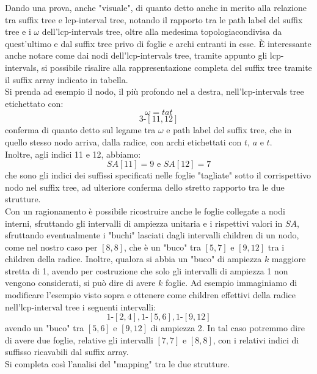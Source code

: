 \documentclass[a4paper,12pt, oneside]{book}
\begin{document}
\begin{esempio}
\begin{figure}[H]
  \end{figure}
  Dando una prova, anche "visuale", di quanto detto anche in merito alla
  relazione tra suffix tree e lcp-interval tree, notando il rapporto tra le path
  label del suffix tree e i $\omega$ dell'lcp-intervals tree, oltre alla
  medesima topologiacondivisa da quest'ultimo e dal suffix tree privo di foglie
  e archi entranti in esse. È interessante anche notare come dai nodi
  dell'lcp-intervals tree, tramite appunto gli lcp-intervals, si possibile
  risalire alla rappresentazione completa del suffix tree tramite il suffix
  array indicato in tabella.\\
  Si prenda ad esempio il nodo, il più profondo nel
  a destra, nell'lcp-intervals tree etichettato con:
  \[\omega =tat\]
  \[3\mbox{-}[11,12]\]
  conferma di quanto detto sul legame tra $\omega$ e path label
  del suffix tree, che in quello stesso nodo arriva, dalla radice, con archi
  etichettati con $t$, $a$ e $t$. \\
  Inoltre, agli indici 11 e 12, abbiamo:
  \[SA[11]=9\mbox{ e }SA[12]=7\]
  che sono gli indici dei suffissi specificati nelle foglie "tagliate" sotto il
  corrispettivo nodo nel suffix tree, ad ulteriore conferma dello stretto
  rapporto tra le due strutture.\\
  Con un ragionamento è possibile ricostruire anche le foglie collegate a nodi
  interni, sfruttando gli intervalli di ampiezza unitaria e i rispettivi valori
  in $SA$, sfruttando eventualmente i "buchi" lasciati dagli intervalli children
  di un nodo, come nel nostro caso per $[8,8]$, che è un "buco" tra $[5,7]$ e
  $[9,12]$ tra i children della radice. Inoltre, qualora si abbia un "buco" di
  ampiezza $k$ maggiore stretta di 1, avendo per costruzione che solo gli
  intervalli di ampiezza 1 non vengono considerati, si può dire di avere $k$
  foglie. Ad esempio immaginiamo di modificare l'esempio visto sopra e ottenere
  come children effettivi della radice nell'lcp-interval tree i seguenti
  intervalli:
  \[1\mbox{-}[2,4],1\mbox{-}[5,6],1\mbox{-}[9,12]\]
  avendo un "buco" tra $[5,6]$ e $[9,12]$ di ampiezza 2. In tal caso potremmo
  dire di avere due foglie, relative gli intervalli $[7,7]$ e $[8,8]$, con i
  relativi indici di suffisso ricavabili dal suffix array.\\ Si
  completa così l'analisi del "mapping" tra le due strutture.
\end{esempio}
\end{document}
